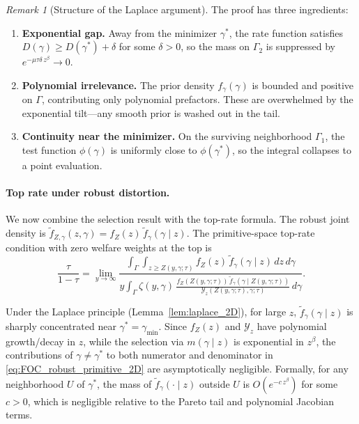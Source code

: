 \documentclass[12pt,a4paper]{article}
\theoremstyle{definition}
\theoremstyle{plain}
\theoremstyle{remark}
\newtheorem{remark}{Remark}[section]
\newcommand{\calY}{\mathcal{Y}}
\begin{document}
\begin{remark}[Structure of the Laplace argument]
\label{rem:laplace_structure_2D}
The proof has three ingredients:
\begin{enumerate}[label=(\roman*)]
  \item \textbf{Exponential gap.}  Away from the minimizer $\gamma^*$, the rate function satisfies $D(\gamma) \geq D(\gamma^*) + \delta$ for some $\delta > 0$, so the mass on $\Gamma_2$ is suppressed by $e^{-\mu\tau\delta\,z^{\beta}} \to 0$.
  \item \textbf{Polynomial irrelevance.}  The prior density $f_{\gamma}(\gamma)$ is bounded and positive on $\Gamma$, contributing only polynomial prefactors.  These are overwhelmed by the exponential tilt---any smooth prior is washed out in the tail.
  \item \textbf{Continuity near the minimizer.}  On the surviving neighborhood $\Gamma_1$, the test function $\phi(\gamma)$ is uniformly close to $\phi(\gamma^*)$, so the integral collapses to a point evaluation.
\end{enumerate}
\end{remark}

\paragraph{Top rate under robust distortion.}

We now combine the selection result with the top-rate formula.  The robust joint density is $\widetilde{f}_{Z,\gamma}(z,\gamma) = f_Z(z)\,\widetilde{f}_{\gamma}(\gamma \mid z)$.  The primitive-space top-rate condition with zero welfare weights at the top is
\begin{equation}
\label{eq:FOC_robust_primitive_2D}
  \frac{\tau}{1-\tau} = \lim_{y \to \infty}
  \frac{\displaystyle\int_{\Gamma}\int_{z \geq Z(y,\gamma;\tau)} f_Z(z)\,\widetilde{f}_{\gamma}(\gamma \mid z)\,dz\,d\gamma}
  {\displaystyle y\int_{\Gamma} \zeta(y,\gamma)\,\frac{f_Z(Z(y,\gamma;\tau))\,\widetilde{f}_{\gamma}(\gamma \mid Z(y,\gamma;\tau))}{\calY_z(Z(y,\gamma;\tau),\gamma;\tau)}\,d\gamma}.
\end{equation}

Under the Laplace principle (Lemma~\ref{lem:laplace_2D}), for large $z$, $\widetilde{f}_{\gamma}(\gamma \mid z)$ is sharply concentrated near $\gamma^* = \gamma_{\min}$.  Since $f_Z(z)$ and $\calY_z$ have polynomial growth/decay in $z$, while the selection via $m(\gamma \mid z)$ is exponential in $z^{\beta}$, the contributions of $\gamma \neq \gamma^*$ to both numerator and denominator in \eqref{eq:FOC_robust_primitive_2D} are asymptotically negligible.  Formally, for any neighborhood $U$ of $\gamma^*$, the mass of $\widetilde{f}_{\gamma}(\cdot \mid z)$ outside $U$ is $O(e^{-c\,z^{\beta}})$ for some $c > 0$, which is negligible relative to the Pareto tail and polynomial Jacobian terms.
\end{document}
